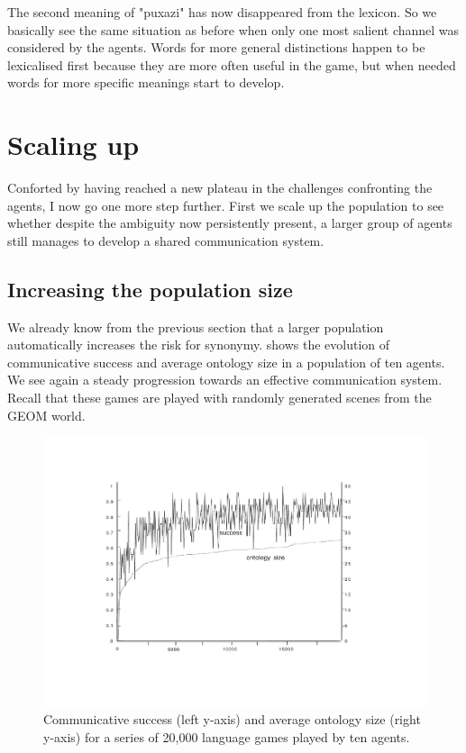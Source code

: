 The second meaning of "puxazi" has now disappeared
from the lexicon. So we basically see the same situation 
as before when only one most salient channel was
considered by the agents. Words for more general distinctions
happen to be lexicalised first because they are more 
often useful in the game, but when needed words for more specific
meanings start to develop. 

\section{Scaling up}

Conforted by having reached a new plateau in 
the challenges confronting the agents, I now go 
one more step further. First we scale up the 
population to see whether despite the ambiguity
now persistently present, a larger group of 
agents still manages to develop a shared
communication system. 

\subsection{Increasing the population size}

We already know from the previous section that 
a larger population automatically increases
the risk for synonymy.  shows the 
evolution of communicative success and average
ontology size in a population
of ten agents. We see again a steady progression
towards an effective communication system. Recall that 
these games are played with randomly generated scenes
from the GEOM world. 
\begin{figure}[htbp]
  \centerline{\includegraphics[width=.80\textwidth]{chap6/figs/agnt10}}
\caption{\label{agnt10} Communicative 
success (left y-axis) and average ontology size 
(right y-axis) for a series of 20,000 
language games played by ten agents.} 
\end{figure}

